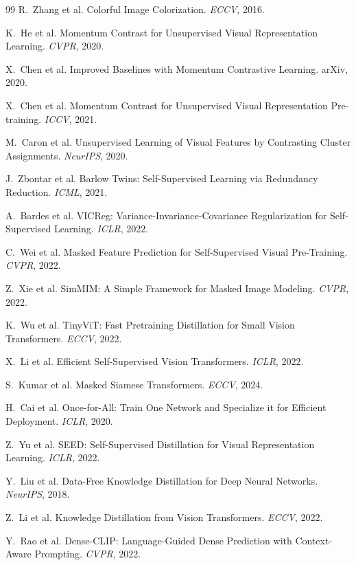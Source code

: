 \documentclass{article}
\begin{document}
\begin{thebibliography}{99}
 R.~Zhang et al. Colorful Image Colorization. \textit{ECCV}, 2016.

 K.~He et al. Momentum Contrast for Unsupervised Visual Representation Learning. \textit{CVPR}, 2020.

 X.~Chen et al. Improved Baselines with Momentum Contrastive Learning. arXiv, 2020.

 X.~Chen et al. Momentum Contrast for Unsupervised Visual Representation Pre-training. \textit{ICCV}, 2021.

 M.~Caron et al. Unsupervised Learning of Visual Features by Contrasting Cluster Assignments. \textit{NeurIPS}, 2020.

 J.~Zbontar et al. Barlow Twins: Self-Supervised Learning via Redundancy Reduction. \textit{ICML}, 2021.

 A.~Bardes et al. VICReg: Variance-Invariance-Covariance Regularization for Self-Supervised Learning. \textit{ICLR}, 2022.

 C.~Wei et al. Masked Feature Prediction for Self-Supervised Visual Pre-Training. \textit{CVPR}, 2022.

 Z.~Xie et al. SimMIM: A Simple Framework for Masked Image Modeling. \textit{CVPR}, 2022.

 K.~Wu et al. TinyViT: Fast Pretraining Distillation for Small Vision Transformers. \textit{ECCV}, 2022.

 X.~Li et al. Efficient Self-Supervised Vision Transformers. \textit{ICLR}, 2022.

 S.~Kumar et al. Masked Siamese Transformers. \textit{ECCV}, 2024.

 H.~Cai et al. Once-for-All: Train One Network and Specialize it for Efficient Deployment. \textit{ICLR}, 2020.

 Z.~Yu et al. SEED: Self-Supervised Distillation for Visual Representation Learning. \textit{ICLR}, 2022.

 Y.~Liu et al. Data-Free Knowledge Distillation for Deep Neural Networks. \textit{NeurIPS}, 2018.

 Z.~Li et al. Knowledge Distillation from Vision Transformers. \textit{ECCV}, 2022.

 Y.~Rao et al. Dense-CLIP: Language-Guided Dense Prediction with Context-Aware Prompting. \textit{CVPR}, 2022.


\end{thebibliography}
\end{document}
